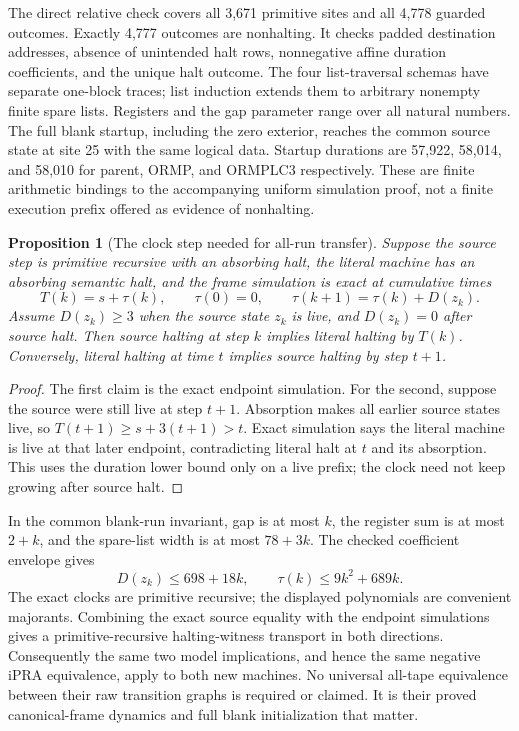 \documentclass[11pt]{article}
\newcommand{\IPRA}{\mathrm{iPRA}}
\newtheorem{proposition}{Proposition}
\begin{document}
The direct relative check covers all 3,671 primitive sites and all
4,778 guarded outcomes.  Exactly 4,777 outcomes are nonhalting.  It
checks padded destination addresses, absence of unintended halt rows,
nonnegative affine duration coefficients, and the unique halt outcome.
The four list-traversal schemas have separate one-block traces; list
induction extends them to arbitrary nonempty finite spare lists.
Registers and the gap parameter range over all natural numbers.
The full blank startup, including the zero exterior, reaches the common
source state at site 25 with the same logical data.  Startup durations
are 57,922, 58,014, and 58,010 for parent, ORMP, and ORMPLC3 respectively.
These are finite arithmetic bindings to the accompanying uniform
simulation proof, not a finite execution prefix offered as evidence of
nonhalting.

\begin{proposition}[The clock step needed for all-run transfer]
Suppose the source step is primitive recursive with an absorbing halt,
the literal machine has an absorbing semantic halt, and the frame
simulation is exact at cumulative times
\[
 T(k)=s+\tau(k),\qquad
 \tau(0)=0,\qquad
 \tau(k+1)=\tau(k)+D(z_k).
\]
Assume \(D(z_k)\geq3\) when the source state \(z_k\) is live, and
\(D(z_k)=0\) after source halt.  Then source halting at step \(k\)
implies literal halting by \(T(k)\).  Conversely, literal halting at
time \(t\) implies source halting by step \(t+1\).
\end{proposition}

\begin{proof}
The first claim is the exact endpoint simulation.  For the second,
suppose the source were still live at step \(t+1\).  Absorption makes
all earlier source states live, so
\(T(t+1)\geq s+3(t+1)>t\).  Exact simulation says the literal machine
is live at that later endpoint, contradicting literal halt at \(t\)
and its absorption.  This uses the duration lower bound only on a live
prefix; the clock need not keep growing after source halt.
\end{proof}

In the common blank-run invariant, gap is at most \(k\), the register
sum is at most \(2+k\), and the spare-list width is at most \(78+3k\).
The checked coefficient envelope gives
\[
 D(z_k)\leq698+18k,\qquad
 \tau(k)\leq9k^2+689k.
\]
The exact clocks are primitive recursive; the displayed polynomials
are convenient majorants.  Combining the exact source equality with
the endpoint simulations gives a primitive-recursive halting-witness
transport in both directions.  Consequently the same two model
implications, and hence the same negative \(\IPRA\) equivalence, apply
to both new machines.  No universal all-tape equivalence between their
raw transition graphs is required or claimed.  It is their proved
canonical-frame dynamics and full blank initialization that matter.
\end{document}
